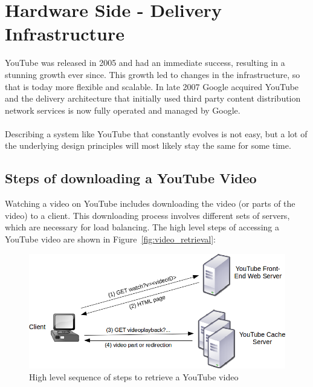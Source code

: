 \section{Hardware Side - Delivery Infrastructure} 

YouTube was released in 2005 and had an immediate success, resulting in a stunning growth ever since. This growth led to changes in the infrastructure, so that is today more flexible and scalable. In late 2007 Google acquired YouTube and the delivery architecture that initially used third party content distribution network services is now fully operated and managed by Google.
\\
\\
Describing a system like YouTube that constantly evolves is not easy, but a lot of the underlying design principles will most likely stay the same for some time.

\subsection{Steps of downloading a YouTube Video}

Watching a video on YouTube includes downloading the video (or parts of the video) to a client. This downloading process involves different sets of servers, which are necessary for load balancing. The high level steps of accessing a YouTube video are shown in Figure~\vref{fig:video_retrieval}:

\begin{figure}[htbp]
  \begin{center}
    \includegraphics[width=\textwidth]{pictures/video_retrieval.png}
    \caption{High level sequence of steps to retrieve a YouTube video}
    \label{fig:video_retrieval}
  \end{center}
\end{figure}

